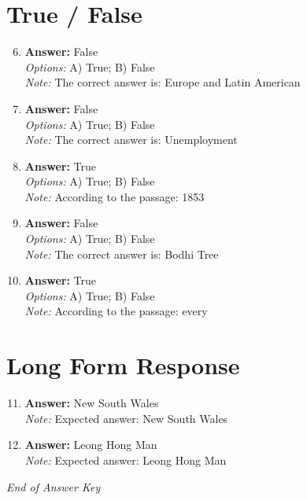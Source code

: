 \documentclass[12pt]{article}
\begin{document}
\section*{True / False}
\begin{enumerate}[label=\arabic*.]
\setcounter{enumi}{5}
\item \textbf{Answer:} False
\\ \textit{Options:} A) True; B) False
\\ \textit{Note:} The correct answer is: Europe and Latin American
\item \textbf{Answer:} False
\\ \textit{Options:} A) True; B) False
\\ \textit{Note:} The correct answer is: Unemployment
\item \textbf{Answer:} True
\\ \textit{Options:} A) True; B) False
\\ \textit{Note:} According to the passage: 1853
\item \textbf{Answer:} False
\\ \textit{Options:} A) True; B) False
\\ \textit{Note:} The correct answer is: Bodhi Tree
\item \textbf{Answer:} True
\\ \textit{Options:} A) True; B) False
\\ \textit{Note:} According to the passage: every
\end{enumerate}

\section*{Long Form Response}
\begin{enumerate}[label=\arabic*.]
\setcounter{enumi}{10}
\item \textbf{Answer:} New South Wales
\\ \textit{Note:} Expected answer: New South Wales
\item \textbf{Answer:} Leong Hong Man
\\ \textit{Note:} Expected answer: Leong Hong Man
\end{enumerate}

\vfill
\noindent\textit{End of Answer Key}
\end{document}
